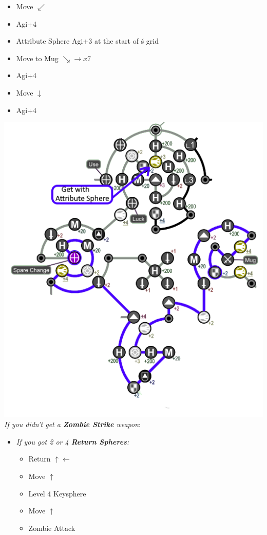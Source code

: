 \begin{spheregrid}
\begin{multicols}{2}
\begin{itemize}
\begin{itemize}
				      \item Move $\swarrow$
				      \item Agi+4
				      \item Attribute Sphere Agi+3 at the start of \rikku\'s grid
				      \item Move to Mug $\searrow\rightarrow x7$
				      \item Agi+4
				      \item Move $\downarrow$
				      \item Agi+4
			      \end{itemize}
			      \includegraphics[width=.8\columnwidth]{graphics/0_return_before_BFA}
			      \columnbreak
			      \tidusf \textit{If you didn't get a \textbf{Zombie Strike} weapon}:
			      \begin{itemize}
				      \item \textit{If you got 2 or 4 \textbf{Return Spheres}:}
				            \begin{itemize}
					            \item Return $\uparrow\leftarrow$
					            \item Move $\uparrow$
					            \item Level 4 Keysphere
					            \item Move $\uparrow$
					            \item Zombie Attack
				            \end{itemize}

\end{itemize}
\end{itemize}
\end{multicols}
\end{spheregrid}

